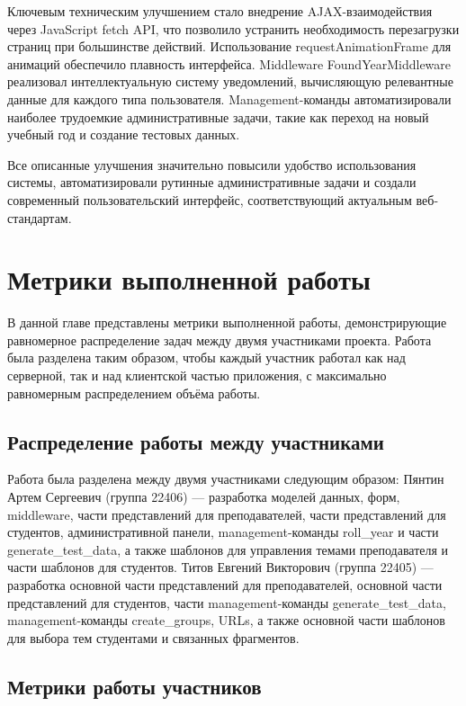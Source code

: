 \documentclass[a4paper,12pt]{article}
\begin{document}
Ключевым техническим улучшением стало внедрение AJAX-взаимодействия через JavaScript fetch API, что позволило устранить необходимость перезагрузки страниц при большинстве действий. Использование requestAnimationFrame для анимаций обеспечило плавность интерфейса. Middleware FoundYearMiddleware реализовал интеллектуальную систему уведомлений, вычисляющую релевантные данные для каждого типа пользователя. Management-команды автоматизировали наиболее трудоемкие административные задачи, такие как переход на новый учебный год и создание тестовых данных.

Все описанные улучшения значительно повысили удобство использования системы, автоматизировали рутинные административные задачи и создали современный пользовательский интерфейс, соответствующий актуальным веб-стандартам.

\newpage
\section{Метрики выполненной работы}

В данной главе представлены метрики выполненной работы, демонстрирующие равномерное распределение задач между двумя участниками проекта. Работа была разделена таким образом, чтобы каждый участник работал как над серверной, так и над клиентской частью приложения, с максимально равномерным распределением объёма работы.

\subsection{Распределение работы между участниками}

Работа была разделена между двумя участниками следующим образом: Пянтин Артем Сергеевич (группа 22406) — разработка моделей данных, форм, middleware, части представлений для преподавателей, части представлений для студентов, административной панели, management-команды roll\_year и части generate\_test\_data, а также шаблонов для управления темами преподавателя и части шаблонов для студентов. Титов Евгений Викторович (группа 22405) — разработка основной части представлений для преподавателей, основной части представлений для студентов, части management-команды generate\_test\_data, management-команды create\_groups, URLs, а также основной части шаблонов для выбора тем студентами и связанных фрагментов.

\subsection{Метрики работы участников}
\end{document}
